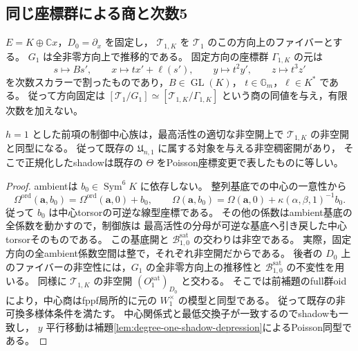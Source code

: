 \subsection{同じ座標群による商と次数5}

$E=K\oplus\mathbb Cx$，$D_0=\partial_x$ を固定し，
$\mathcal T_{1,K}$ を $\mathcal T_1$ のこの方向上のファイバーとする。
$G_1$ は全非零方向上で推移的である。
固定方向の座標群 $\Gamma_{1,K}$ の元は
\[
 s\longmapsto Bs',\qquad x\longmapsto tx'+\ell(s'),\qquad
 y\longmapsto t^2y',\qquad z\longmapsto t^3z'
\]
を次数スカラーで割ったものであり，$B\in\operatorname{GL}(K)$，
$t\in\mathbb G_m$，$\ell\in K^*$ である。
従って方向固定は
$[\mathcal T_1/G_1]\simeq[\mathcal T_{1,K}/\Gamma_{1,K}]$
という商の同値を与え，有限次数を加えない。

\begin{lemma}[制御中心の共通稠密開]
\label{lem:degree-one-controlled-common-open}
$h=1$ とした前項の制御中心族は，最高活性の適切な非空開上で
$\mathcal T_{1,K}$ の非空開と同型になる。
従って既存の $\mathfrak U_{n,1}$ に属する対象を与える非空稠密開があり，
そこで正規化したshadowは既存の $\Theta$ をPoisson座標変更で表したものに等しい。
\end{lemma}
\begin{proof}
ambientは $b_0\in\operatorname{Sym}^6K$ に依存しない。
整列基底での中心の一意性から
\[
 \Omega^{\mathrm{ord}}(\boldsymbol a,b_0)
  =\Omega^{\mathrm{ord}}(\boldsymbol a,0)+b_0,
 \qquad
 \Omega(\boldsymbol a,b_0)
  =\Omega(\boldsymbol a,0)+\kappa(\alpha,\beta,1)^{-1}b_0.
\]
従って $b_0$ は中心torsorの可逆な線型座標である。
その他の係数はambient基底の全係数を動かすので，制御族は
最高活性の分母が可逆な基底へ引き戻した中心torsorそのものである。
この基底開と $\mathcal B_{1,0}^{\mathrm{sat}}$ の交わりは非空である。
実際，固定方向の全ambient係数空間は整で，それぞれ非空開だからである。
後者の $D_0$ 上のファイバーの非空性には，$G_1$ の全非零方向上の推移性と
$\mathcal B_{1,0}^{\mathrm{sat}}$ の不変性を用いる。
同様に $\mathcal T_{1,K}$ の非空開 $(O_1^{\mathrm{sat}})_{D_0}$ と交わる。
そこでは前補題のfull群oidにより，中心商はfppf局所的に元の $W_1^\times$ の模型と同型である。
従って既存の非可換多様体条件を満たす。
中心関係式と最低交換子が一致するのでshadowも一致し，
$y$ 平行移動は補題\ref{lem:degree-one-shadow-depression}によるPoisson同型である。
\end{proof}


